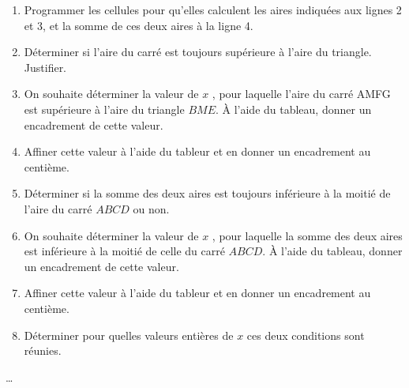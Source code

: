 \begin{exercice*}
\begin{enumerate}
        \smallskip
        \item Programmer les cellules pour qu'elles calculent les aires indiquées aux lignes 2 et 3, et la somme de ces deux aires à la ligne 4.
        \item Déterminer si l'aire du carré est toujours supérieure à l'aire du triangle. Justifier.
        \item On souhaite déterminer la valeur de $x$ , pour laquelle l'aire du carré AMFG est supérieure à l'aire du triangle $BME$. À l'aide du tableau, donner un encadrement de cette valeur.
        \item Affiner cette valeur à l'aide du tableur et en donner un encadrement au centième.
        \item Déterminer si la somme des deux aires est toujours inférieure à la moitié de l'aire du carré $ABCD$ ou non.
        \item On souhaite déterminer la valeur de $x$ , pour laquelle la somme des deux aires est inférieure à la moitié de celle du carré $ABCD$. 
        À l'aide du tableau, donner un encadrement de cette valeur.
        \item Affiner cette valeur à l'aide du tableur et en donner un encadrement au centième.
        \item Déterminer pour quelles valeurs entières de $x$ ces deux conditions sont réunies.
    \end{enumerate}
\end{exercice*}
\begin{corrige}
    \dots
\end{corrige}

